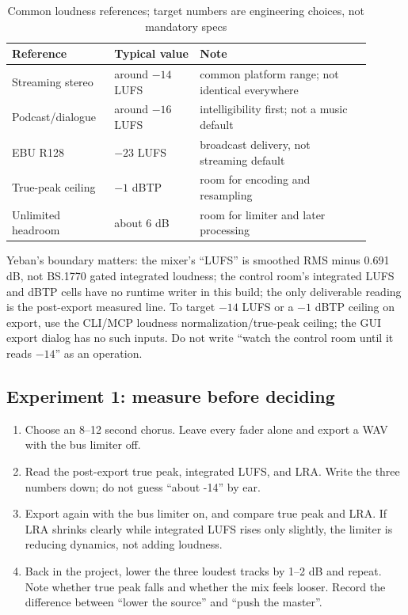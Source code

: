 \begin{table}[htbp]
\centering
\small
\begin{tabular}{@{}p{0.24\linewidth}p{0.22\linewidth}p{0.44\linewidth}@{}}
\hline
Reference & Typical value & Note \\
\hline
Streaming stereo & around $-14$ LUFS & common platform range; not identical everywhere \\
Podcast/dialogue & around $-16$ LUFS & intelligibility first; not a music default \\
EBU R128 & $-23$ LUFS & broadcast delivery, not streaming default \\
True-peak ceiling & $-1$ dBTP & room for encoding and resampling \\
Unlimited headroom & about 6 dB & room for limiter and later processing \\
\hline
\end{tabular}
\caption{Common loudness references; target numbers are engineering choices, not mandatory specs}
\label{tab:advanced-loudness-targets}
\end{table}

Yeban's boundary matters: the mixer's ``LUFS'' is smoothed RMS minus 0.691 dB, not BS.1770 gated integrated loudness; the control room's integrated LUFS and dBTP cells have no runtime writer in this build; the only deliverable reading is the post-export measured line. To target $-14$ LUFS or a $-1$ dBTP ceiling on export, use the CLI/MCP loudness normalization/true-peak ceiling; the GUI export dialog has no such inputs. Do not write ``watch the control room until it reads $-14$'' as an operation.

\subsection{Experiment 1: measure before deciding}

\begin{enumerate}
  \item Choose an 8--12 second chorus. Leave every fader alone and export a WAV with the bus limiter off.
  \item Read the post-export true peak, integrated LUFS, and LRA. Write the three numbers down; do not guess ``about -14'' by ear.
  \item Export again with the bus limiter on, and compare true peak and LRA. If LRA shrinks clearly while integrated LUFS rises only slightly, the limiter is reducing dynamics, not adding loudness.
  \item Back in the project, lower the three loudest tracks by 1--2 dB and repeat. Note whether true peak falls and whether the mix feels looser. Record the difference between ``lower the source'' and ``push the master''.
\end{enumerate}

